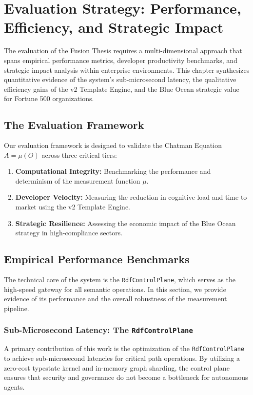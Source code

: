 \chapter{Evaluation Strategy: Performance, Efficiency, and Strategic Impact}

The evaluation of the Fusion Thesis requires a multi-dimensional approach that spans empirical performance metrics, developer productivity benchmarks, and strategic impact analysis within enterprise environments. This chapter synthesizes quantitative evidence of the system's sub-microsecond latency, the qualitative efficiency gains of the v2 Template Engine, and the Blue Ocean strategic value for Fortune 500 organizations.

\section{The Evaluation Framework}

Our evaluation framework is designed to validate the Chatman Equation $A = \mu(O)$ across three critical tiers:
\begin{enumerate}
    \item \textbf{Computational Integrity:} Benchmarking the performance and determinism of the measurement function $\mu$.
    \item \textbf{Developer Velocity:} Measuring the reduction in cognitive load and time-to-market using the v2 Template Engine.
    \item \textbf{Strategic Resilience:} Assessing the economic impact of the Blue Ocean strategy in high-compliance sectors.
\end{enumerate}

\section{Empirical Performance Benchmarks}

The technical core of the system is the \texttt{RdfControlPlane}, which serves as the high-speed gateway for all semantic operations. In this section, we provide evidence of its performance and the overall robustness of the measurement pipeline.

\subsection{Sub-Microsecond Latency: The \texttt{RdfControlPlane}}

A primary contribution of this work is the optimization of the \texttt{RdfControlPlane} to achieve sub-microsecond latencies for critical path operations. By utilizing a zero-cost typestate kernel and in-memory graph sharding, the control plane ensures that security and governance do not become a bottleneck for autonomous agents.

